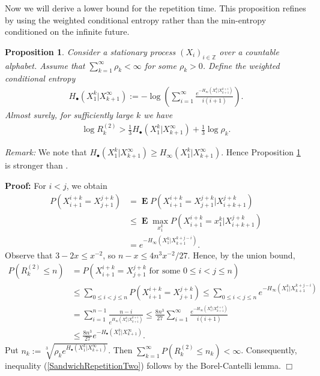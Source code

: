 \documentclass[a4paper]{article}
\newcommand{\okra}[1]{\left( #1 \right)}
\DeclareMathOperator{\mean}{\mathbf{E}}
\newtheorem{proposition}{Proposition}
\newenvironment*{proof}{\begin{trivlist}\item[]
\noindent\textbf{Proof:}}{$\Box$\par\end{trivlist}}
\begin{document}
Now we will derive a lower bound for the repetition time.  This
proposition refines \citep[Theorem 9.25]{Debowski21} by using the
weighted conditional entropy rather than the min-entropy conditioned
on the infinite future.
\begin{proposition}
  \label{theoSandwichRepetitionTwo}
  Consider a stationary process $(X_i)_{i\in\mathbb{Z}}$ over a
  countable alphabet. Assume that $\sum_{k=1}^\infty \rho_k<\infty$
  for some $\rho_k>0$. Define the weighted conditional entropy
  \begin{align}
    H_\bullet(X_1^k|X_{k+1}^\infty):=-\log \okra{
    \sum_{i=1}^\infty\frac{e^{-H_\infty(X_1^k|X_{k+1}^{k+i})}}{i(i+1)}}.
  \end{align}
  Almost surely, for sufficiently large $k$ we have
  \begin{align}
    \label{SandwichRepetitionTwo}
    \log R^{(2)}_k> \frac{1}{3}H_\bullet(X_1^k|X_{k+1}^\infty)
    +\frac{1}{3}\log\rho_k
    .
  \end{align}
\end{proposition}
\emph{Remark:} We note that
$H_\bullet(X_1^k|X_{k+1}^\infty)\ge
H_\infty(X_1^k|X_{k+1}^\infty)$. Hence Proposition
\ref{theoSandwichRepetitionTwo} is stronger than \citep[Theorem
9.25]{Debowski21}.
\begin{proof}
  For $i<j$, we obtain 
\begin{align}
  P(X_{i+1}^{i+k}=X_{j+1}^{j+k})
  &=
    \mean
    P(X_{i+1}^{i+k}=X_{j+1}^{j+k}|X_{i+k+1}^{j+k})
    \nonumber\\
  &\le
    \mean \max_{x_1^k} P(X_{i+1}^{i+k}=x_1^k|X_{i+k+1}^{j+k})
    \nonumber\\
  &=
    e^{-H_\infty(X_1^k|X_{k+1}^{k+j-i})}
    .
\end{align}
Observe that $3-2x\le x^{-2}$, so $n-x\le 4n^3x^{-2}/27$.
Hence, by the union bound,
\begin{align}
  P(R^{(2)}_k\le n)
  &= P\okra{X_{i+1}^{i+k}=X_{j+1}^{j+k} \text{ for some }
    0\le i<j\le n}
    \nonumber\\
  &\le \sum_{0\le i<j\le n} P(X_{i+1}^{i+k}=X_{j+1}^{j+k})
    \le \sum_{0\le i<j\le n}  e^{-H_\infty(X_1^k|X_{k+1}^{k+j-i})}
    \nonumber\\
  &= \sum_{i=1}^{n-1}
    \frac{n-i}{e^{H_\infty(X_1^k|X_{k+1}^{k+i})}}
    \le \frac{8n^3}{27}
    \sum_{i=1}^\infty\frac{e^{-H_\infty(X_1^k|X_{k+1}^{k+i})}}{i(i+1)}
    \nonumber\\
  &\le \frac{8n^3}{27} e^{-H_\bullet(X_1^k|X_{k+1}^\infty)}.
\end{align}
Put $n_k:=\sqrt[3]{\rho_k e^{H_\bullet(X_1^k|X_{k+1}^\infty)}}$. Then
$\sum_{k=1}^\infty P(R^{(2)}_k\le n_k)<\infty$.  Consequently,
inequality (\ref{SandwichRepetitionTwo}) follows by the
Borel-Cantelli lemma.
\end{proof}
\end{document}

